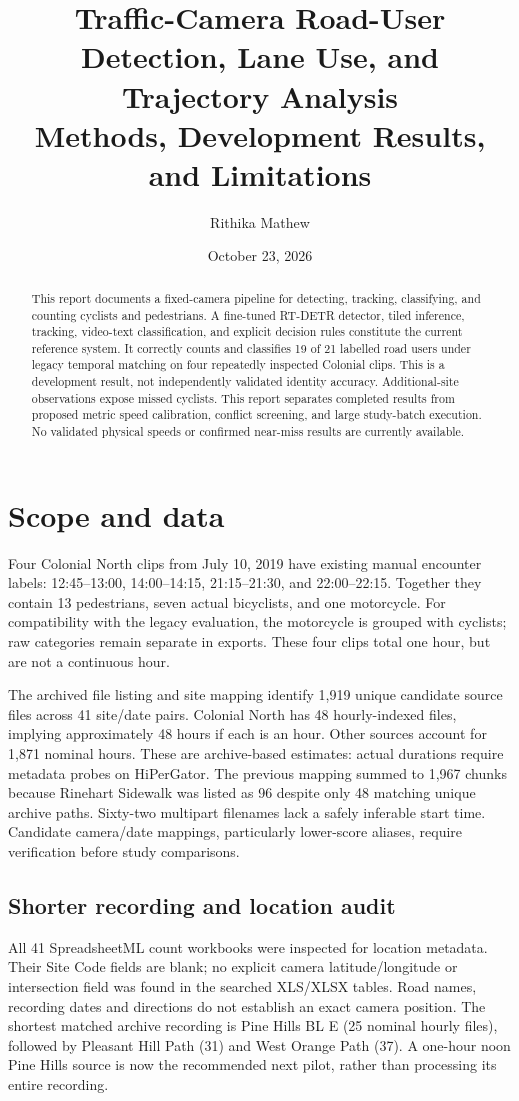 \documentclass[11pt,letterpaper]{article}
\title{Traffic-Camera Road-User Detection, Lane Use, and Trajectory Analysis\\\large Methods, Development Results, and Limitations}
\author{Rithika Mathew}
\date{October 23, 2026}
\begin{document}
\maketitle
\begin{abstract}
This report documents a fixed-camera pipeline for detecting, tracking, classifying, and counting cyclists and pedestrians. A fine-tuned RT-DETR detector, tiled inference, tracking, video-text classification, and explicit decision rules constitute the current reference system. It correctly counts and classifies 19 of 21 labelled road users under legacy temporal matching on four repeatedly inspected Colonial clips. This is a development result, not independently validated identity accuracy. Additional-site observations expose missed cyclists. This report separates completed results from proposed metric speed calibration, conflict screening, and large study-batch execution. No validated physical speeds or confirmed near-miss results are currently available.
\end{abstract}

\section{Scope and data}
Four Colonial North clips from July 10, 2019 have existing manual encounter labels: 12:45--13:00, 14:00--14:15, 21:15--21:30, and 22:00--22:15. Together they contain 13 pedestrians, seven actual bicyclists, and one motorcycle. For compatibility with the legacy evaluation, the motorcycle is grouped with cyclists; raw categories remain separate in exports. These four clips total one hour, but are not a continuous hour.

The archived file listing and site mapping identify 1,919 unique candidate source files across 41 site/date pairs. Colonial North has 48 hourly-indexed files, implying approximately 48 hours if each is an hour. Other sources account for 1,871 nominal hours. These are archive-based estimates: actual durations require metadata probes on HiPerGator. The previous mapping summed to 1,967 chunks because Rinehart Sidewalk was listed as 96 despite only 48 matching unique archive paths. Sixty-two multipart filenames lack a safely inferable start time. Candidate camera/date mappings, particularly lower-score aliases, require verification before study comparisons.

\subsection{Shorter recording and location audit}
All 41 SpreadsheetML count workbooks were inspected for location metadata. Their Site Code fields are blank; no explicit camera latitude/longitude or intersection field was found in the searched XLS/XLSX tables. Road names, recording dates and directions do not establish an exact camera position. The shortest matched archive recording is Pine Hills BL E (25 nominal hourly files), followed by Pleasant Hill Path (31) and West Orange Path (37). A one-hour noon Pine Hills source is now the recommended next pilot, rather than processing its entire recording.
\end{document}
